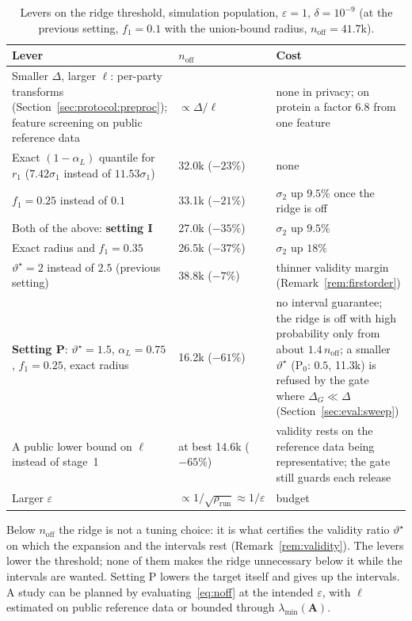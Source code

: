 \documentclass[11pt]{article}
\theoremstyle{definition}
\theoremstyle{plain}
\newcommand{\bA}{\mathbf{A}}
\begin{document}
\begin{table}[ht]
  \centering\small
  \caption{Levers on the ridge threshold, simulation population, $\varepsilon = 1$, $\delta = 10^{-9}$ (at the previous setting, $f_1 = 0.1$ with the union-bound radius, $n_{\mathrm{off}} = 41.7$k).}
  \label{tab:noff_levers}
  \begin{tabularx}{\textwidth}{@{}>{\raggedright\arraybackslash}p{}l>{\raggedright\arraybackslash}X@{}}
    \toprule
    Lever & $n_{\mathrm{off}}$ & Cost \\
    \midrule
    Smaller $\Delta$, larger $\ell$: per-party transforms (Section~\ref{sec:protocol:preproc}); feature screening on public reference data & $\propto \Delta/\ell$ & none in privacy; on protein a factor $6.8$ from one feature \\
    Exact $(1 - \alpha_L)$ quantile for $r_1$ ($7.42\sigma_1$ instead of $11.53\sigma_1$) & 32.0k ($-23\%$) & none \\
    $f_1 = 0.25$ instead of $0.1$ & 33.1k ($-21\%$) & $\sigma_2$ up $9.5\%$ once the ridge is off \\
    Both of the above: \textbf{setting I} & 27.0k ($-35\%$) & $\sigma_2$ up $9.5\%$ \\
    Exact radius and $f_1 = 0.35$ & 26.5k ($-37\%$) & $\sigma_2$ up $18\%$ \\
    $\vartheta^\star = 2$ instead of $2.5$ (previous setting) & 38.8k ($-7\%$) & thinner validity margin (Remark~\ref{rem:firstorder}) \\
    \textbf{Setting P}: $\vartheta^\star = 1.5$, $\alpha_L = 0.75$, $f_1 = 0.25$, exact radius & 16.2k ($-61\%$) & no interval guarantee; the ridge is off with high probability only from about $1.4\,n_{\mathrm{off}}$; a smaller $\vartheta^\star$ (P$_0$: $0.5$, 11.3k) is refused by the gate where $\Delta_G \ll \Delta$ (Section~\ref{sec:eval:sweep}) \\
    A public lower bound on $\ell$ instead of stage~1 & at best 14.6k ($-65\%$) & validity rests on the reference data being representative; the gate still guards each release \\
    Larger $\varepsilon$ & $\propto 1/\sqrt{\rho_{\mathrm{run}}} \approx 1/\varepsilon$ & budget \\
    \bottomrule
  \end{tabularx}
\end{table}

Below $n_{\mathrm{off}}$ the ridge is not a tuning choice: it is what certifies the validity ratio $\vartheta^\star$ on which the expansion and the intervals rest (Remark~\ref{rem:validity}). The levers lower the threshold; none of them makes the ridge unnecessary below it while the intervals are wanted. Setting P lowers the target itself and gives up the intervals. A study can be planned by evaluating~\eqref{eq:noff} at the intended $\varepsilon$, with $\ell$ estimated on public reference data or bounded through $\lambda_{\min}(\bA)$.
\end{document}
